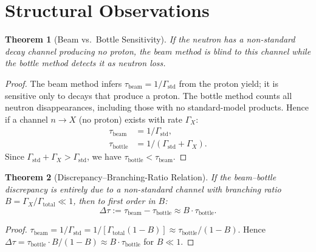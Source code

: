 \documentclass[12pt,a4paper]{article}
\newtheorem{theorem}{Theorem}[section]
\theoremstyle{definition}
\theoremstyle{remark}
\begin{document}
\section{Structural Observations}
\label{sec:structure}

\begin{theorem}[Beam vs.\ Bottle Sensitivity]
\label{thm:methods}
If the neutron has a non-standard decay channel producing no proton,
the beam method is \emph{blind} to this channel while the bottle
method \emph{detects} it as neutron loss.
\end{theorem}

\begin{proof}
The beam method infers $\tau_{\mathrm{beam}} = 1/\Gamma_{\mathrm{std}}$
from the proton yield; it is sensitive only to decays that produce a
proton.  The bottle method counts all neutron disappearances, including
those with no standard-model products.  Hence if a channel $n \to X$
(no proton) exists with rate $\Gamma_X$:
\begin{align*}
  \tau_{\mathrm{beam}} &= 1/\Gamma_{\mathrm{std}}, \\
  \tau_{\mathrm{bottle}} &= 1/(\Gamma_{\mathrm{std}} + \Gamma_X).
\end{align*}
Since $\Gamma_{\mathrm{std}} + \Gamma_X > \Gamma_{\mathrm{std}}$,
we have $\tau_{\mathrm{bottle}} < \tau_{\mathrm{beam}}$.
\end{proof}

\begin{theorem}[Discrepancy--Branching-Ratio Relation]
\label{thm:branch}
If the beam--bottle discrepancy is entirely due to a non-standard
channel with branching ratio $B = \Gamma_X/\Gamma_{\mathrm{total}}
\ll 1$, then to first order in $B$:
\begin{equation}
  \label{eq:delta-tau}
  \Delta\tau := \tau_{\mathrm{beam}} - \tau_{\mathrm{bottle}}
  \approx B \cdot \tau_{\mathrm{bottle}}.
\end{equation}
\end{theorem}

\begin{proof}
$\tau_{\mathrm{beam}} = 1/\Gamma_{\mathrm{std}}
= 1/[\Gamma_{\mathrm{total}}(1 - B)]
\approx \tau_{\mathrm{bottle}}/(1 - B)$.
Hence $\Delta\tau = \tau_{\mathrm{bottle}}\cdot B/(1-B) \approx
B\cdot\tau_{\mathrm{bottle}}$ for $B \ll 1$.
\end{proof}
\end{document}
